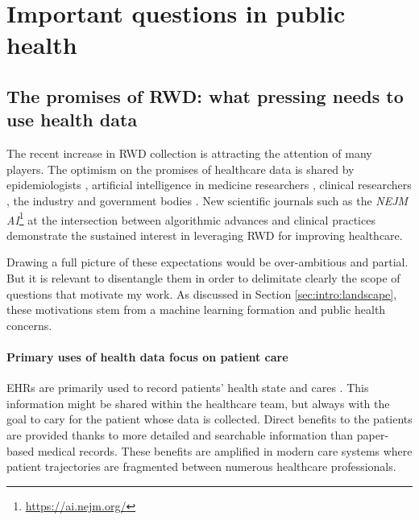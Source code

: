 \documentclass[french,12pt,twoside,a4paper]{book}
\begin{document}


\section{Important questions in public health}%
\label{sec:intro:causality}%

\subsection{The promises of RWD: what pressing needs to use health data}

The recent increase in RWD collection is attracting the attention of many
players. The optimism on the promises of healthcare data is shared by
epidemiologists \citep{mooney2015epidemiology,hernan_using_2016}, artificial
intelligence in medicine researchers \citep{schwartz1987artificial,
  yu2018artificial}, clinical researchers
\citep{schwalbe2020artificial,dzau2023anticipating}, the industry
\citep{pfizer2019rwd,iqvia2023rwd} and government bodies
\citep{mcginnis2013best,fda_real_2018,ema2023rwd}. New scientific journals such
as the \emph{NEJM AI}\footnote{\url{https://ai.nejm.org/}} \citep{beam_2023} at
the intersection between algorithmic advances and clinical practices demonstrate
the sustained interest in leveraging RWD for improving healthcare.

Drawing a full picture of these expectations would be over-ambitious and
partial. But it is relevant to disentangle them in order to delimitate
clearly the scope of questions that motivate my work. As discussed in Section
\ref{sec:intro:landscape}, these motivations stem from a machine learning
formation and public health concerns.

\paragraph{Primary uses of health data focus on patient care}

EHRs are primarily used to record patients' health state and cares
\citep{safran_toward_2007,eu_primary_2022}. This information might be shared
within the healthcare team, but always with the goal to cary for the patient
whose data is collected. Direct benefits to the patients are provided thanks to
more detailed and searchable information than paper-based medical records. These
benefits are amplified in modern care systems where patient trajectories are
fragmented between numerous healthcare professionals.
\end{document}

